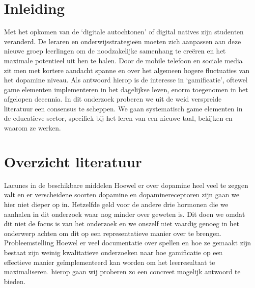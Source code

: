 \documentclass{hogent-article}
\affiliation{
  \textsuperscript{1} \href{mailto:ArneVerbanck@student.hogent.be}{ArneVerbanck@student.hogent.be}}
\affiliation{
  \textsuperscript{2} \href{mailto:GustavoVanEenooghe@student.hogent.be}{GustavoVanEenooghe@student.hogent.be}
}
\begin{document}
\flushbottom %
\maketitle %
\tableofcontents %
\thispagestyle{empty} %


\section{Inleiding}




Met het opkomen van de ‘digitale autochtonen’ of digital natives zijn studenten veranderd. De leraren en onderwijsstrategieën moeten zich aanpassen aan deze nieuwe groep leerlingen om de noodzakelijke samenhang te creëren en het maximale potentieel uit hen te halen. Door de mobile telefoon en sociale media zit men met kortere aandacht spanne en over het algemeen hogere fluctuaties van het dopamine niveau. Als antwoord hierop is de interesse in ‘gamificatie’, oftewel game elementen implementeren in het dagelijkse leven, enorm toegenomen in het afgelopen decennia. In dit onderzoek proberen we uit de weid verspreide literatuur een consensus te scheppen. We gaan systematisch game elementen in de educatieve sector, specifiek bij het leren van een nieuwe taal, bekijken en waarom ze werken.
\section{Overzicht literatuur}


Lacunes in de beschikbare middelen
Hoewel er over dopamine heel veel te zeggen valt en er verscheidene soorten dopamine en dopaminereceptoren zijn gaan we hier niet dieper op in. Hetzelfde geld voor de andere drie hormonen die we aanhalen in dit onderzoek waar nog minder over geweten is. Dit doen we omdat dit niet de focus is van het onderzoek en we onszelf niet vaardig genoeg in het onderwerp achten om dit op een representatieve manier over te brengen.
Probleemstelling
Hoewel er veel documentatie over spellen en hoe ze gemaakt zijn bestaat zijn weinig kwalitatieve onderzoeken naar hoe gamificatie op een effectieve manier geïmplementeerd kan worden om het leerresultaat te maximaliseren. hierop gaan wij proberen zo een concreet mogelijk antwoord te bieden.
\end{document}
